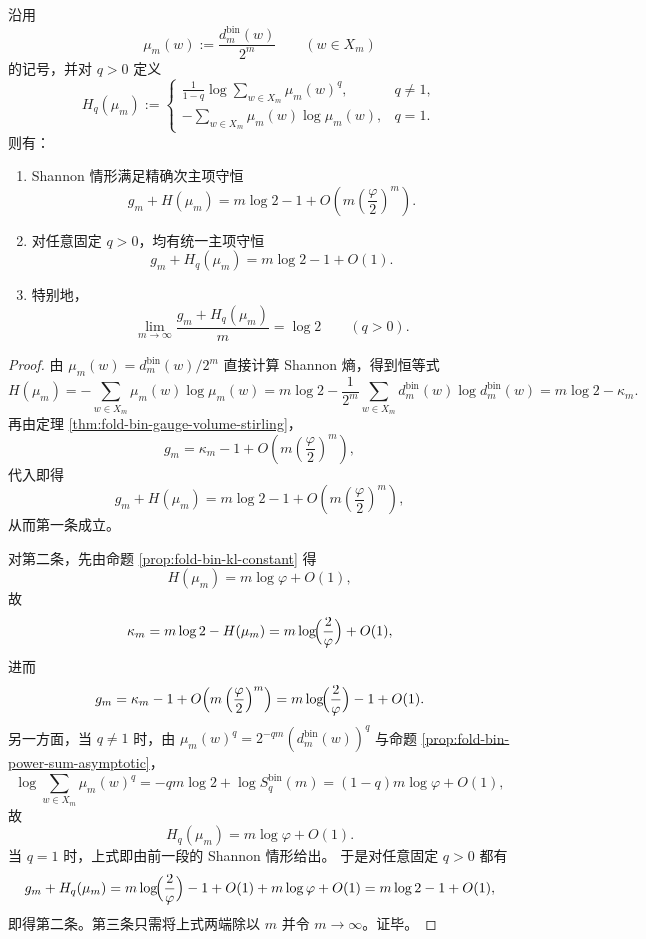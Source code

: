 \begin{theorem}\label{thm:gut-gauge-renyi-conservation}
沿用
\[
\mu_m(w):=\frac{d_m^{\mathrm{bin}}(w)}{2^m}
\qquad (w\in X_m)
\]
的记号，并对 \(q>0\) 定义
\[
H_q(\mu_m):=
\begin{cases}
\displaystyle \frac{1}{1-q}\log\sum_{w\in X_m}\mu_m(w)^q, & q\neq 1,\\[8pt]
\displaystyle -\sum_{w\in X_m}\mu_m(w)\log\mu_m(w), & q=1.
\end{cases}
\]
则有：
\begin{enumerate}
  \item Shannon 情形满足精确次主项守恒
  \[
  g_m+H(\mu_m)=m\log 2-1+O\!\left(m\left(\frac{\varphi}{2}\right)^m\right).
  \]
  \item 对任意固定 \(q>0\)，均有统一主项守恒
  \[
  g_m+H_q(\mu_m)=m\log 2-1+O(1).
  \]
  \item 特别地，
  \[
  \lim_{m\to\infty}\frac{g_m+H_q(\mu_m)}{m}=\log 2
  \qquad(q>0).
  \]
\end{enumerate}
\end{theorem}
\begin{proof}
由 \(\mu_m(w)=d_m^{\mathrm{bin}}(w)/2^m\) 直接计算 Shannon 熵，得到恒等式
\[
H(\mu_m)
=
-\sum_{w\in X_m}\mu_m(w)\log\mu_m(w)
=
m\log 2-\frac{1}{2^m}\sum_{w\in X_m}d_m^{\mathrm{bin}}(w)\log d_m^{\mathrm{bin}}(w)
=
m\log 2-\kappa_m.
\]
再由定理 \ref{thm:fold-bin-gauge-volume-stirling}，
\[
g_m=\kappa_m-1+O\!\left(m\left(\frac{\varphi}{2}\right)^m\right),
\]
代入即得
\[
g_m+H(\mu_m)=m\log 2-1+O\!\left(m\left(\frac{\varphi}{2}\right)^m\right),
\]
从而第一条成立。
\par
对第二条，先由命题 \ref{prop:fold-bin-kl-constant} 得
\[
H(\mu_m)=m\log\varphi+O(1),
\]
故
\[
\kappa_m=m\log 2-H(\mu_m)=m\log\!\Bigl(\frac{2}{\varphi}\Bigr)+O(1),
\]
进而
\[
g_m=\kappa_m-1+O\!\left(m\left(\frac{\varphi}{2}\right)^m\right)
=
m\log\!\Bigl(\frac{2}{\varphi}\Bigr)-1+O(1).
\]
另一方面，当 \(q\neq 1\) 时，由 \(\mu_m(w)^q=2^{-qm}(d_m^{\mathrm{bin}}(w))^q\) 与命题 \ref{prop:fold-bin-power-sum-asymptotic}，
\[
\log\sum_{w\in X_m}\mu_m(w)^q
=
-qm\log 2+\log S_q^{\mathrm{bin}}(m)
=
(1-q)m\log\varphi+O(1),
\]
故
\[
H_q(\mu_m)=m\log\varphi+O(1).
\]
当 \(q=1\) 时，上式即由前一段的 Shannon 情形给出。
于是对任意固定 \(q>0\) 都有
\[
g_m+H_q(\mu_m)
=
m\log\!\Bigl(\frac{2}{\varphi}\Bigr)-1+O(1)+m\log\varphi+O(1)
=
m\log 2-1+O(1),
\]
即得第二条。第三条只需将上式两端除以 \(m\) 并令 \(m\to\infty\)。证毕。
\end{proof}

